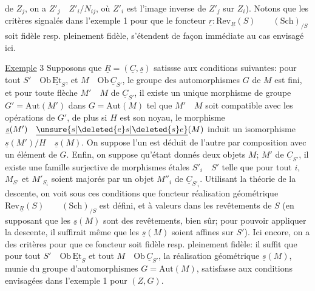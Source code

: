 de $Z_j$, on a $Z'_j\quad Z'_i/N_{ij}$, où $Z'_i$ est l'image inverse de $Z'_j$ sur $Z_i$). Notons que les critères signalés dans l'exemple 1 pour que le foncteur $\underline{r}:\mathrm{Rev}_{\underline{R}}(S)\qquad(\mathrm{Sch})_{/S}$ soit fidèle resp. pleinement fidèle, s'étendent de façon immédiate au cas envisagé ici.

\uline{Exemple} 3 Supposons que $\underline{R}=(\underline{C},\underline{s})$ satissse aux conditions suivantes: pour tout $S'\quad\mathrm{Ob}\,\underline{\mathrm{Et}}_S$, et $M\quad\mathrm{Ob}\,\underline{C}_{S'}$, le groupe des automorphismes $G$ de $M$ est fini, et pour toute flèche $M'\quad M$ de $\underline{C}_{S'}$, il existe un unique morphisme de groupe $G'=\mathrm{Aut}(M')$ dans $G=\mathrm{Aut}(M)$ tel que $M'\quad M$ soit compatible avec les opérations de $G'$, de plus si $H$ est son noyau, le morphisme $\underline{s}(M')\quad\underline{\unsure{s|\deleted{e}s|\deleted{s}e}}(M)$ induit un isomorphisme $\underline{s}(M')/H\quad\underline{s}(M)$.  On suppose  l'un est déduit de l'autre par composition avec un élément de $G$. Enfin, on suppose qu'étant donnés deux objets $M$; $M'$ de $\underline{C}_{S'}$, il existe une famille surjective de morphismes étales $S'_i\quad S'$ telle que pour tout $i$, $M_{S'}$ et $M'_{S_i}$ soient majorés par un objet $M''_i$ de $\underline{C}_{S'_i}$. Utilisant la théorie de la descente, on voit sous ces conditions que  foncteur réalisation géométrique  $\mathrm{Rev}_{\underline{R}}(S)\qquad(\mathrm{Sch})_{/S}$ est défini, et à valeurs dans les  revêtements de $S$ (en supposant que les $\underline{s}(M)$ sont des revêtements, bien sûr; pour pouvoir appliquer la descente, il suffirait même que les $\underline{s}(M)$ soient affines sur $S'$). Ici encore, on a des critères pour que ce foncteur soit fidèle resp. pleinement fidèle: il suffit que pour tout $S'\quad\mathrm{Ob}\,\underline{\mathrm{Et}}_S$ et tout $M\quad\mathrm{Ob}\,\underline{C}_{S'}$, la réalisation géométrique $\underline{s}(M)$, munie du groupe d'automorphismes $G=\mathrm{Aut}(M)$, satisfasse aux conditions  envisagées dans l'exemple 1 pour $(Z,G)$.

